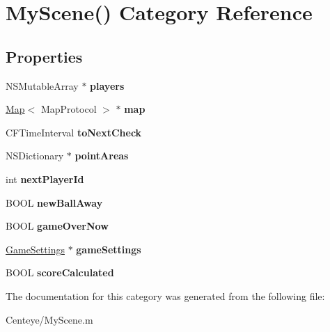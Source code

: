 \hypertarget{category_my_scene_07_08}{\section{My\+Scene() Category Reference}
\label{category_my_scene_07_08}
}
\subsection*{Properties}
\begin{DoxyCompactItemize}
\item 
\hypertarget{category_my_scene_07_08_a3b194a8c83b95893b0e0636a35b71057}{N\+S\+Mutable\+Array $\ast$ {\bfseries players}}\label{category_my_scene_07_08_a3b194a8c83b95893b0e0636a35b71057}

\item 
\hypertarget{category_my_scene_07_08_a5040414971aba6d5589a561648c21bd6}{\hyperlink{interface_map}{Map}$<$ Map\+Protocol $>$ $\ast$ {\bfseries map}}\label{category_my_scene_07_08_a5040414971aba6d5589a561648c21bd6}

\item 
\hypertarget{category_my_scene_07_08_a16e3aa55b0bdb1ced26596c7e4da56b7}{C\+F\+Time\+Interval {\bfseries to\+Next\+Check}}\label{category_my_scene_07_08_a16e3aa55b0bdb1ced26596c7e4da56b7}

\item 
\hypertarget{category_my_scene_07_08_a6be005632b717c9e034cb690d4da197a}{N\+S\+Dictionary $\ast$ {\bfseries point\+Areas}}\label{category_my_scene_07_08_a6be005632b717c9e034cb690d4da197a}

\item 
\hypertarget{category_my_scene_07_08_a162345a329aece9db9d62164104094b8}{int {\bfseries next\+Player\+Id}}\label{category_my_scene_07_08_a162345a329aece9db9d62164104094b8}

\item 
\hypertarget{category_my_scene_07_08_aa5f6554eea28ff36f359b4a7233ce9fc}{B\+O\+O\+L {\bfseries new\+Ball\+Away}}\label{category_my_scene_07_08_aa5f6554eea28ff36f359b4a7233ce9fc}

\item 
\hypertarget{category_my_scene_07_08_a8f9480bf731e872039821063e6df8bd3}{B\+O\+O\+L {\bfseries game\+Over\+Now}}\label{category_my_scene_07_08_a8f9480bf731e872039821063e6df8bd3}

\item 
\hypertarget{category_my_scene_07_08_ad20c1450663f4466f36c270df49d2c05}{\hyperlink{interface_game_settings}{Game\+Settings} $\ast$ {\bfseries game\+Settings}}\label{category_my_scene_07_08_ad20c1450663f4466f36c270df49d2c05}

\item 
\hypertarget{category_my_scene_07_08_aee2276226743e909c9293b4e3860e139}{B\+O\+O\+L {\bfseries score\+Calculated}}\label{category_my_scene_07_08_aee2276226743e909c9293b4e3860e139}

\end{DoxyCompactItemize}


The documentation for this category was generated from the following file\+:\begin{DoxyCompactItemize}
\item 
Centeye/My\+Scene.\+m\end{DoxyCompactItemize}
